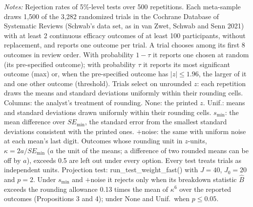 \begin{table}[htbp]
\begin{minipage}{\linewidth}\footnotesize\textit{Notes:} Rejection rates of 5\%-level tests over 500 repetitions. Each meta-sample draws 1{,}500 of the 3{,}282 randomized trials in the Cochrane Database of Systematic Reviews (Schwab's data set, as in van Zwet, Schwab and Senn 2021) with at least 2 continuous efficacy outcomes of at least 100 participants, without replacement, and reports one outcome per trial. A trial chooses among its first 8 outcomes in review order. With probability $1 - \tau$ it reports one chosen at random (its pre-specified outcome); with probability $\tau$ it reports its most significant outcome (max) or, when the pre-specified outcome has $|z| \le 1.96$, the larger of it and one other outcome (threshold). Trials select on unrounded $z$: each repetition draws the means and standard deviations uniformly within their rounding cells. Columns: the analyst's treatment of rounding. None: the printed $z$. Unif.: means and standard deviations drawn uniformly within their rounding cells. $s_{\min}$: the mean difference over $SE_{\min}$, the standard error from the smallest standard deviations consistent with the printed ones. $+$noise: the same with uniform noise at each mean's last digit. Outcomes whose rounding unit in $z$-units, $\kappa = 2a/SE_{\min}$ ($a$ the unit of the means; a difference of two rounded means can be off by $a$), exceeds 0.5 are left out under every option. Every test treats trials as independent units. Projection test: run\_test\_weight\_fast() with $J = 40$, $J_0 = 20$ and $p = 2$. Under $s_{\min}$ and $+$noise it rejects only when its breakdown statistic $\hat B$ exceeds the rounding allowance 0.13 times the mean of $\kappa^6$ over the reported outcomes (Propositions 3 and 4); under None and Unif.\ when $p \le 0.05$.\end{minipage}
\end{table}
